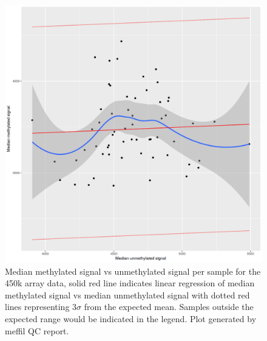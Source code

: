 \documentclass[]{book}
\begin{document}
\begin{figure}

{\centering \includegraphics[width=0.8\linewidth]{figs/MAVIDOSqc450kmethVsUnmeth} 

}

\caption{Median methylated signal vs unmethylated signal per sample for the 450k array data, solid red line indicates linear regression of median methylated signal vs median unmethylated signal with dotted red lines representing \(3\sigma\) from the expected mean. Samples outside the expected range would be indicated in the legend. Plot generated by meffil QC report.}\label{fig:MAVIDOSqc450kmethVsUnmeth}
\end{figure}
\end{document}
